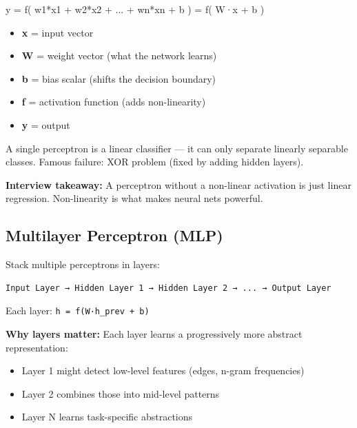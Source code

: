 \documentclass[11pt]{article}
\providecommand{\tightlist}{\setlength{\itemsep}{1pt}\setlength{\parskip}{0pt}}
\newenvironment{Shaded}{\begin{snugshade}}{\end{snugshade}}
\newcommand{\NormalTok}[1]{\textcolor[rgb]{0.81,0.81,0.76}{#1}}
\newcommand{\OperatorTok}[1]{\textcolor[rgb]{0.81,0.81,0.76}{#1}}
\begin{document}
\begin{Shaded}
\begin{Highlighting}[]
\NormalTok{y }\OperatorTok{=}\NormalTok{ f( w1}\OperatorTok{*}\NormalTok{x1 }\OperatorTok{+}\NormalTok{ w2}\OperatorTok{*}\NormalTok{x2 }\OperatorTok{+}\NormalTok{ ... }\OperatorTok{+}\NormalTok{ wn}\OperatorTok{*}\NormalTok{xn }\OperatorTok{+}\NormalTok{ b )}
  \OperatorTok{=}\NormalTok{ f( W·x }\OperatorTok{+}\NormalTok{ b )}
\end{Highlighting}
\end{Shaded}

\begin{itemize}
\tightlist
\item
  \textbf{x} = input vector
\item
  \textbf{W} = weight vector (what the network learns)
\item
  \textbf{b} = bias scalar (shifts the decision boundary)
\item
  \textbf{f} = activation function (adds non-linearity)
\item
  \textbf{y} = output
\end{itemize}

A single perceptron is a linear classifier --- it can only separate linearly separable classes. Famous failure: XOR problem (fixed by adding hidden layers).

\textbf{Interview takeaway:} A perceptron without a non-linear activation is just linear regression. Non-linearity is what makes neural nets powerful.

\subsection{Multilayer Perceptron (MLP)}\label{multilayer-perceptron-mlp}

Stack multiple perceptrons in layers:

\setcodelang{}

\begin{verbatim}
Input Layer → Hidden Layer 1 → Hidden Layer 2 → ... → Output Layer
\end{verbatim}

Each layer: \texttt{h\ =\ f(W·h\_prev\ +\ b)}

\textbf{Why layers matter:} Each layer learns a progressively more abstract representation:

\begin{itemize}
\tightlist
\item
  Layer 1 might detect low-level features (edges, n-gram frequencies)
\item
  Layer 2 combines those into mid-level patterns
\item
  Layer N learns task-specific abstractions
\end{itemize}
\end{document}
